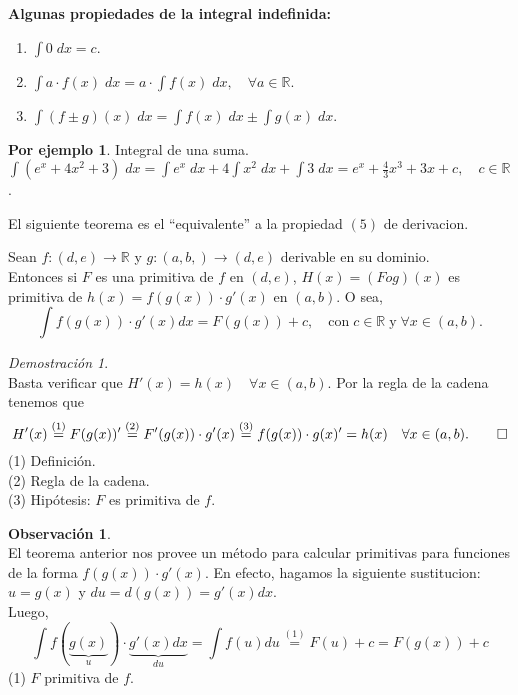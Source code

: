 \documentclass{article}
\theoremstyle{definition}
\theoremstyle{definition}
\newtheorem*{obs}{Observación}
\newtheorem*{ej}{Por ejemplo}
\theoremstyle{remark}
\newtheorem*{demo}{Demostración}
\newcommand\R{\ensuremath{\mathbb{R}}}
\begin{document}
\begin{center}
\textbf{Algunas propiedades de la integral indefinida:}
\end{center}

\begin{enumerate}
  \item $\int{0\;dx}=c$.
  \item $\int{a\cdot f(x)\;dx=a\cdot \int{f(x)\;dx}},\quad \forall a \in \R $.
  \item $\int{(f\pm g)(x)\;dx=\int{f(x)\;dx\pm \int{g(x)\;dx}}}$.
\end{enumerate}

\begin{ej} Integral de una suma. \\
  $\int{(e^x+4x^2+3)\;dx}=\int{e^x\;dx}+4\int{x^2\;dx}+\int{3\;dx}=e^x+\frac{4}{3}x^3+3x+c,\quad c \in \R$.
\end{ej}

El siguiente teorema es el ``equivalente'' a la propiedad $(5)$ de derivacion.
\pagebreak
\begin{teo}$\;$  \\
Sean $f:(d,e)\to \R$ y $g:(a,b,)\to(d,e)$ derivable en su dominio.\\ Entonces si $F$ es una primitiva de $f$ en $(d,e)$, $H(x)=(Fog)(x)$ es primitiva de $h(x)=f(g(x))\cdot g'(x)$ en $(a,b)$. O sea,
\[
\int{f(g(x)) \cdot g'(x)dx}=F(g(x))+c,\quad \text{con}\; c\in\R \;\text{y}\; \forall x \in (a,b).
\]
\end{teo}

\begin{demo} \; \\
  Basta verificar que $H'(x)=h(x)\quad \forall x \in (a,b)$. Por la regla de la cadena tenemos que \[
  H'(x)\overset{(1)}{=}F(g(x))'\overset{(2)}{=}F'(g(x))\cdot g'(x) \overset{(3)}{=} f(g(x)) \cdot g(x)' = h(x) \quad \forall x \in (a,b). \qed \]
(1) Definición.   \\
(2) Regla de la cadena.   \\
(3) Hipótesis: $F$ es primitiva de $f$.
\end{demo}

\begin{obs} \; \\
  El teorema anterior nos provee un método para calcular primitivas para funciones de la forma $f(g(x))\cdot g'(x)$. En efecto, hagamos la siguiente sustitucion: $u=g(x)$ y $ du=d(g(x))=g'(x)dx$.\\
  Luego, \[
  \int{f(\underbrace{g(x)}_{u})\cdot \underbrace{g'(x)dx}_{du}}=\int{f(u)du}\overset{(1)}{=}F(u)+c=F(g(x))+c
\]
(1) $F$ primitiva de $f$.
\end{obs}
\end{document}
